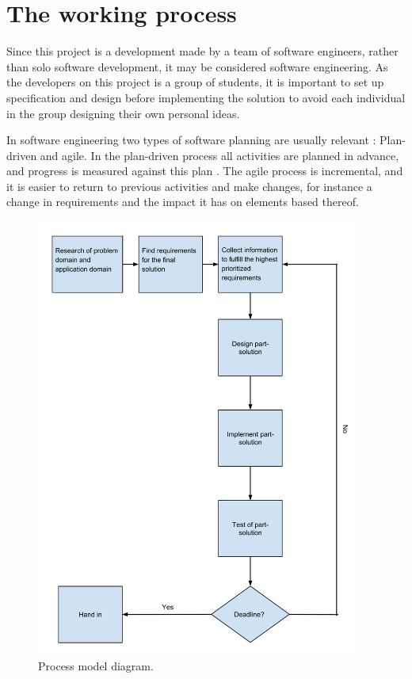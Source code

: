 \chapter{The working process}
Since this project is a development made by a team of software engineers, rather than solo software development, it may be considered software engineering. As the developers on this project is a group of students, it is important to set up specification and design before implementing the solution  to avoid each individual in the group designing their own personal ideas.

In software engineering two types of software planning are usually relevant : Plan-driven and agile. In the plan-driven process all activities are planned in advance, and progress is measured against this plan . The agile process is incremental, and it is easier to return to previous activities and make changes, for instance a change in requirements and the impact it has on elements based thereof.

\begin{figure}[h!]
\centering
\includegraphics[width=0.95\textwidth]{figures/ProcessmodelDiagram.png}
\caption{Process model diagram.}
\label{fig:processmodelDiagram}
\end{figure}


